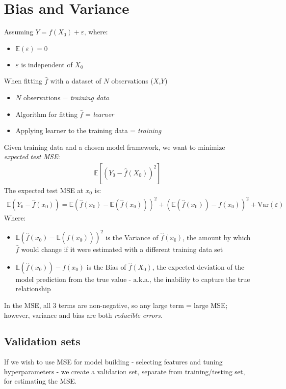 \documentclass{article}
\begin{document}
\section{Bias and Variance}

Assuming $Y=f(X_0)+\varepsilon$, where:
\begin{itemize}
    \item $\mathbb{E}(\varepsilon)=0$
    \item $\varepsilon$ is independent of $X_0$
\end{itemize}
When fitting $\hat{f}$ with a dataset of $N$ observations ($X$,$Y$)
\begin{itemize}
    \item $N$ observations = \textit{training data}
    \item Algorithm for fitting $\hat{f}$ = \textit{learner}
    \item Applying learner to the training data = \textit{training}
\end{itemize}
Given training data and a chosen model framework, we want to minimize \textit{expected test MSE}: 
\begin{align*}
    \mathbb{E}[(Y_0-\hat{f}(X_0))^2]
\end{align*}
The expected test MSE at $x_0$ is:
\begin{align*}
    \mathbb{E}(Y_0-\hat{f}(x_0))=\mathbb{E}(\hat{f}(x_0)-\mathbb{E}(\hat{f}(x_0)))^2+(\mathbb{E}(\hat{f}(x_0))-f(x_0))^2+\text{Var}(\varepsilon)
\end{align*}
Where:
\begin{itemize}
    \item $\mathbb{E}(\hat{f}(x_0)-\mathbb{E}(\hat{f}(x_0)))^2$ is the Variance of $\hat{f}(x_0)$, the amount by which $\hat{f}$ would change if it were estimated with a different training data set
    \item $\mathbb{E}(\hat{f}(x_0))-f(x_0)$ is the Bias of $\hat{f}(X_0)$, the expected deviation of the model prediction from the true value - a.k.a., the inability to capture the true relationship
\end{itemize}
In the MSE, all 3 terms are non-negative, so any large term = large MSE; however, variance and bias are both \textit{reducible errors}.

\subsection{Validation sets}

If we wish to use MSE for model building - selecting features and tuning hyperparameters - we create a validation set, separate from training/testing set, for estimating the MSE.
\end{document}

